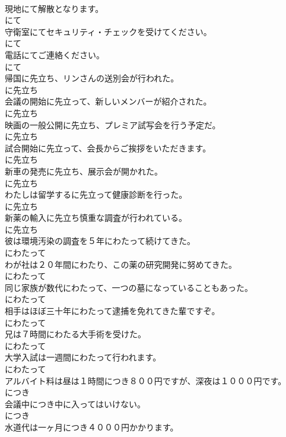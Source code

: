 \documentclass[8pt]{extreport}
\begin{document}
\begin{CJK}{UTF8}{min}
\\	現地にて解散となります。	
\\	にて
\\	守衛室にてセキュリティ・チェックを受けてください。	
\\	にて
\\	電話にてご連絡ください。	
\\	にて
\\	帰国に先立ち、リンさんの送別会が行われた。	
\\	に先立ち
\\	会議の開始に先立って、新しいメンバーが紹介された。	
\\	に先立ち
\\	映画の一般公開に先立ち、プレミア試写会を行う予定だ。	
\\	に先立ち
\\	試合開始に先立って、会長からご挨拶をいただきます。	
\\	に先立ち
\\	新車の発売に先立ち、展示会が開かれた。	
\\	に先立ち
\\	わたしは留学するに先立って健康診断を行った。	
\\	に先立ち
\\	新薬の輸入に先立ち慎重な調査が行われている。	
\\	に先立ち
\\	彼は環境汚染の調査を５年にわたって続けてきた。	
\\	にわたって
\\	わが社は２０年間にわたり、この薬の研究開発に努めてきた。	
\\	にわたって
\\	同じ家族が数代にわたって、一つの墓になっていることもあった。	
\\	にわたって
\\	相手はほぼ三十年にわたって逮捕を免れてきた輩ですぞ。	
\\	にわたって
\\	兄は７時間にわたる大手術を受けた。	
\\	にわたって
\\	大学入試は一週間にわたって行われます。	
\\	にわたって
\\	アルバイト料は昼は１時間につき８００円ですが、深夜は１０００円です。	
\\	につき
\\	会議中につき中に入ってはいけない。	
\\	につき
\\	水道代は一ヶ月につき４０００円かかります。	

\end{CJK}
\end{document}
